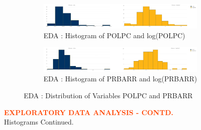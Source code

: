 \begin{figure}[!ht]
	\begin{subfigure}[b]{1.0\textwidth}
		\centering
		\includegraphics[width=0.9\textwidth,height=0.30\textheight]{images/EDA_histograms_polpc.jpg}
		\caption{EDA : Histogram of POLPC and log(POLPC)}
		\label{fig:EDA Histogram POLPC}
	\end{subfigure}\vspace{3mm}%
	
	\begin{subfigure}[b]{1.0\textwidth}
		\centering
		\includegraphics[width=0.9\textwidth,height=0.30\textheight]{images/EDA_histograms_prbarr.jpg}
		\caption{EDA : Histogram of PRBARR and log(PRBARR)}
		\label{fig:EDA Histogram PRBARR}
	\end{subfigure}
	\label{fig:POLPC and PRBARR Histogram}
	\caption{EDA : Distribution of Variables POLPC and PRBARR}
\end{figure}

\pagebreak

\textbf{\textcolor{OrangeRed}{EXPLORATORY DATA ANALYSIS - CONTD.}}\\

Histograms Continued.\\

